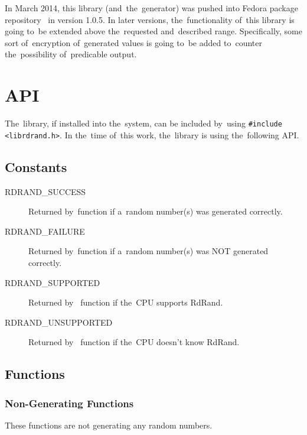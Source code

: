 \par{
In March 2014, this library (and~the~generator) was pushed into Fedora package repository~\cite{RdRandFedoraPackage,RdRandFedoraPackageBugzilla} in version 1.0.5. 
In later versions, the~functionality of~this library is going to~be extended above the~requested and~described range. Specifically, some sort of~encryption of~generated values is going to~be added to~counter the~possibility of~predicable output.
}


\section{API} \label{sec:library-api}
\par{
The~library, if installed into the~system, can be included by~using {\tt \#include <librdrand.h>}. In the~time of~this work, the~library is using the~following API.
}
\subsection{Constants}
\begin{description}
  \item[RDRAND\_SUCCESS] Returned by~function if a~random number(s) was generated correctly.
  \item[RDRAND\_FAILURE] Returned by~function if a~random number(s) was NOT generated correctly.
  \item[RDRAND\_SUPPORTED] Returned by~ function if the~CPU supports RdRand.
  \item[RDRAND\_UNSUPPORTED] Returned by~ function if the~CPU doesn't know RdRand.
  
\end{description}


\subsection{Functions}

\subsubsection{Non-Generating Functions}

These functions are not generating any random numbers.\\

\\

